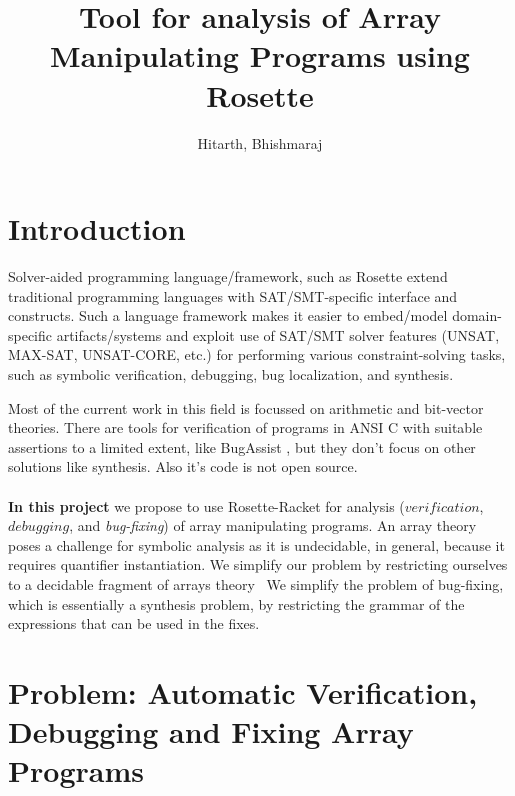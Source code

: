 \documentclass[letterpaper]{article} %
\title{Tool for analysis of Array Manipulating Programs using Rosette}
\author{Hitarth,  Bhishmaraj}
\begin{document}
\maketitle

\section{Introduction}

Solver-aided programming language/framework, such as Rosette \cite{torlak2013growing} extend traditional programming languages with SAT/SMT-specific interface and constructs.
Such a language framework makes it easier to embed/model domain-specific artifacts/systems and exploit use of SAT/SMT solver features (UNSAT, MAX-SAT, UNSAT-CORE, etc.) for performing various constraint-solving tasks, such as symbolic verification, debugging, bug localization, and synthesis.

Most of the current work in this field is focussed on arithmetic and bit-vector theories. There are tools for verification of programs in ANSI C with suitable assertions to  a limited extent, like BugAssist \cite{jose2011cause}, but they don't focus on other solutions like synthesis. Also it's code is not open source.\\
\\
{\bf In this project} we propose to use Rosette-Racket for analysis ($verification$, $debugging$, and \emph{bug-fixing}) of array manipulating programs.
An array theory poses a challenge for symbolic analysis as it is undecidable, in general, because it requires quantifier instantiation.
We simplify our problem by restricting ourselves to a decidable fragment of arrays theory~\cite{christ2015weakly}
We simplify the problem of bug-fixing, which is essentially a synthesis problem, by restricting the grammar of the expressions that can be used in the fixes.

\section {Problem: Automatic Verification, Debugging and Fixing Array Programs}
\end{document}

